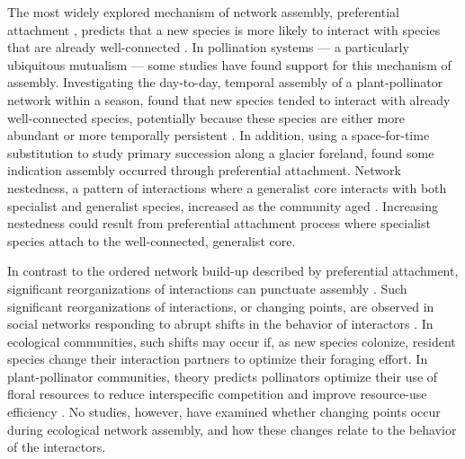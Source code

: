 \documentclass[12pt]{article}
\begin{document}
The most widely explored mechanism of network assembly, preferential
attachment \citep{barabasi1999emergence}, predicts that a new species
is more likely to interact with species that are already
well-connected \citep[''the rich-get-richer''
principle,][]{barabasi1999emergence}. In pollination systems --- a
particularly ubiquitous mutualism \citep{ollerton-2011-321,
  klein-2007-303} --- some studies have found support for this
mechanism of assembly. Investigating the day-to-day, temporal assembly
of a plant-pollinator network within a season, \cite{Olesen2008} found
that new species tended to interact with already well-connected
species, potentially because these species are either more abundant or
more temporally persistent \citep{Olesen2008}. In addition, using a
space-for-time substitution to study primary succession along a
glacier foreland, \cite{albrecht2010plant} found some indication
assembly occurred through preferential attachment. Network nestedness,
a pattern of interactions where a generalist core interacts with both
specialist and generalist species, increased as the community aged
\citep{albrecht2010plant}. Increasing nestedness could result from
preferential attachment process where specialist species attach to the
well-connected, generalist core.  %

In contrast to the ordered network build-up described by preferential
attachment, significant reorganizations of interactions can punctuate
assembly \citep{peel2014detecting}. Such significant reorganizations
of interactions, or changing points, are observed in social networks
responding to abrupt shifts in the behavior of interactors
\citep{peel2014detecting}.  In ecological communities, such shifts may
occur if, as new species colonize, resident species change their
interaction partners to optimize their foraging effort. In
plant-pollinator communities, theory predicts pollinators optimize
their use of floral resources to reduce interspecific competition and
improve resource-use efficiency \citep{pyke1984optimal,
  valdovinos2010consequences, valdovinos2013adaptive,
  albrecht2010plant, Bluthgen2007}. No studies, however, have examined
whether changing points occur during ecological network assembly, and
how these changes relate to the behavior of the interactors.
\end{document}
